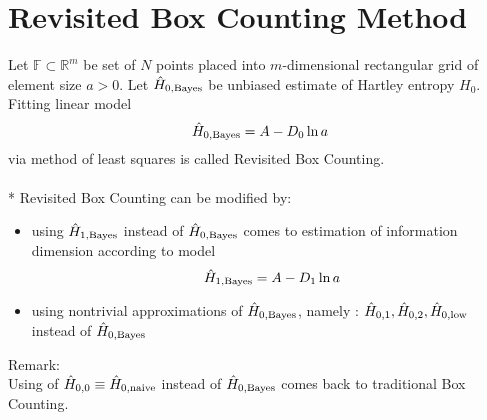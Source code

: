 \section {Revisited Box Counting Method}
Let $\mathbb{F} \subset \mathbb{R}^{m}$ be set of $N$ points placed into $m$-dimensional rectangular grid of element size $a > 0$. Let $\hat{H}_{0,\mbox{\scriptsize{Bayes}}}$ be unbiased estimate of Hartley entropy $H_{0}$. Fitting linear model
\begin{equation} 
\label{eq:hlinmod}
\hat{H}_{0,\mbox{\scriptsize{Bayes}}} = A - D_{0}\ln{a}
\end{equation}
via method of least squares is called Revisited Box Counting.\\
\\*
Revisited Box Counting can be modified by:
\begin{itemize}
\item using $\hat{H}_{1,\mbox{\scriptsize{Bayes}}}$ instead of $\hat{H}_{0,\mbox{\scriptsize{Bayes}}}$ comes to estimation of information dimension according to model
\begin{equation} 
\label{eq:inform}
\hat{H}_{1,\mbox{\scriptsize{Bayes}}} = A - D_{1}\ln{a}
\end{equation}
\item using nontrivial approximations of $\hat{H}_{0,\mbox{\scriptsize{Bayes}}}$, namely : $\hat{H}_{0,1}, \hat{H}_{0,2}, \hat{H}_{0,\mbox{\scriptsize{low}}}$ instead of $\hat{H}_{0,\mbox{\scriptsize{Bayes}}}$
\end{itemize}
Remark: \\
Using of $\hat{H}_{0,0} \equiv \hat{H}_{0,\mbox{\scriptsize{naive}}}$ instead of $\hat{H}_{0,\mbox{\scriptsize{Bayes}}}$ comes back to traditional Box Counting.